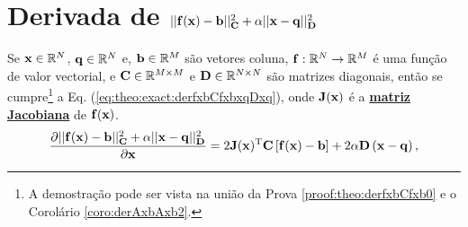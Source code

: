 
\section{Derivada de $||\VECTOR{f}(\VECTOR{x})-\VECTOR{b}||_{\MATRIX{C}}^2+\alpha||\VECTOR{x}-\VECTOR{q}||_{\MATRIX{D}}^2$ 
}

\begin{theorem}\label{theo:exact:derfxbCfxbxqDxq}
Se 
$\VECTOR{x}\in \mathbb{R}^N$,
$\VECTOR{q}\in \mathbb{R}^N$ e, 
$\VECTOR{b}\in \mathbb{R}^M$ são vetores coluna,  
$\VECTOR{f}: \mathbb{R}^{N}\rightarrow \mathbb{R}^{M}$ é uma função de valor vectorial, e
$\MATRIX{C} \in \mathbb{R}^{M\times M}$ e $\MATRIX{D} \in \mathbb{R}^{N\times N}$ são matrizes diagonais, 
então se cumpre\footnote{A 
demostração pode ser vista na união da Prova \ref{proof:theo:derfxbCfxb0} e o Corolário \ref{coro:derAxbAxb2}.} a Eq. (\ref{eq:theo:exact:derfxbCfxbxqDxq}),
onde $\MATRIX{J}(\VECTOR{x})$ é a \hyperref[def:jacobian]{\textbf{matriz Jacobiana}} de $\VECTOR{f}(\VECTOR{x})$.
\begin{equation}\label{eq:theo:exact:derfxbCfxbxqDxq}
\frac{\partial ||\VECTOR{f}(\VECTOR{x})-\VECTOR{b}||_{\MATRIX{C}}^2+\alpha||\VECTOR{x}-\VECTOR{q}||_{\MATRIX{D}}^2}{\partial \VECTOR{x}} 
= 2 \MATRIX{J}(\VECTOR{x})^{\transpose}\MATRIX{C}\left[\VECTOR{f}(\VECTOR{x})-\VECTOR{b}\right]
+ 2 \alpha\MATRIX{D}\left(\VECTOR{x}-\VECTOR{q}\right),
\end{equation}

\end{theorem}



